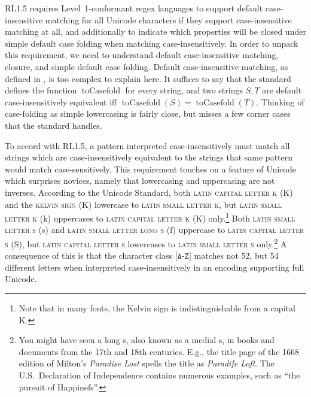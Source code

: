 \documentclass[5p,final,number,sort&compress]{elsarticle}
\newcommand{\re}[1]{\texttt{#1}}
\begin{document}
RL1.5 requires Level~1-conformant regex languages to support default case-insensitive matching for all Unicode characters if they support case-insensitive matching at all, and additionally to indicate which properties will be closed under simple default case folding when matching case-insensitively. In order to unpack this requirement, we need to understand default case-insensitive matching, closure, and simple default case folding. Default case-insensitive matching, as defined in \citep[\S 3.1.3]{ustd62}, is too complex to explain here. It suffices to say that the standard defines the function $\operatorname{toCasefold}$ for every string, and two strings $S,T$ are default case-insensitively equivalent iff $\operatorname{toCasefold}(S) = \operatorname{toCasefold}(T)$. Thinking of case-folding as simple lowercasing is fairly close, but misses a few corner cases that the standard handles.

To accord with RL1.5, a pattern interpreted case-insen\-si\-tively must match all strings which are case-insensitively equivalent to the strings that same pattern would match case-sensitively. This requirement touches on a feature of Unicode which surprises novices, namely that lowercasing and uppercasing are not inverses. According to the Unicode Standard, both \textsc{latin capital letter k} (K) and the \textsc{kelvin sign} (K)
lowercase to \textsc{latin small letter k}, but \textsc{latin small letter k} (k) uppercases to \textsc{latin capital letter k} (K) only.\footnote{Note that in many fonts, the Kelvin sign is indistinguishable from a capital K.} Both \textsc{latin small letter s} (s) and \textsc{latin small letter long s} (ſ) uppercase to \textsc{latin capital letter s} (S), but \textsc{latin capital letter s} lowercases to \textsc{latin small letter s} only.\footnote{You might have seen a long s, also known as a medial s, in books and documents from the 17th and 18th centuries. E.g., the title page of the 1668 edition of Milton's \emph{Paradise Lost} spells the title as \emph{Paradiſe Loſt}. The U.S.\ Declaration of Independence contains numerous examples, such as ``the pursuit of Happineſs''.}
A consequence of this is that the character class $\re{[A-Z]}$ matches not 52, but 54 different letters when interpreted case-insensitively in an encoding supporting full Unicode. 
\end{document}

